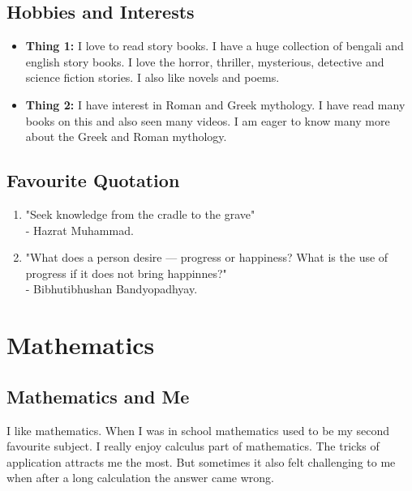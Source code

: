 \documentclass[12pt]{article}
\begin{document}
\subsection{Hobbies and Interests}
\begin{itemize}
    \item \textbf{Thing 1: }I love to read story books. I have a huge collection of bengali and english story books. I love the horror, thriller, mysterious, detective and science fiction stories. I also like novels and poems.
    \item \textbf{Thing 2: }I have interest in Roman and Greek mythology. I have read many books on this and also seen many videos. I am eager to know many more about the Greek and Roman mythology. 
\end{itemize}
\subsection{Favourite Quotation}
\begin{enumerate} 
    \item "Seek knowledge from the cradle to the grave"\\
    - Hazrat Muhammad.
    \item "What does a person desire --- progress or happiness? What is the use of progress if it does not bring happinnes?"\\
    - Bibhutibhushan Bandyopadhyay.
    \end{enumerate}
    \section{Mathematics}

\subsection{Mathematics and Me}
I like mathematics. When I was in school mathematics used to be my second favourite subject. I really enjoy calculus part of mathematics. The tricks of application attracts me the most. But sometimes it also felt challenging to me when after a long calculation the answer came wrong.
\end{document}
